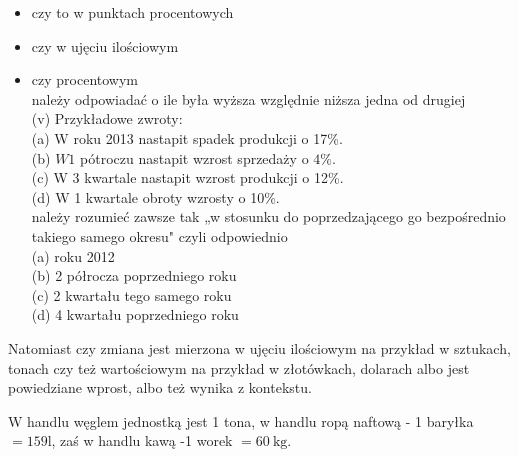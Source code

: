 \documentclass[10pt]{article}
\begin{document}
\begin{itemize}
  \item czy to w punktach procentowych
  \item czy w ujęciu ilościowym
  \item czy procentowym\\
należy odpowiadać o ile była wyższa względnie niższa jedna od drugiej\\
(v) Przykładowe zwroty:\\
(a) W roku 2013 nastapit spadek produkcji o 17\%.\\
(b) \(W 1\) pótroczu nastapit wzrost sprzedaży o \(4 \%\).\\
(c) W 3 kwartale nastapit wzrost produkcji o 12\%.\\
(d) W 1 kwartale obroty wzrosty o 10\%.\\
należy rozumieć zawsze tak „w stosunku do poprzedzającego go bezpośrednio takiego samego okresu" czyli odpowiednio\\
(a) roku 2012\\
(b) 2 półrocza poprzedniego roku\\
(c) 2 kwartału tego samego roku\\
(d) 4 kwartału poprzedniego roku
\end{itemize}

Natomiast czy zmiana jest mierzona w ujęciu ilościowym na przykład w sztukach, tonach czy też wartościowym na przykład w złotówkach, dolarach albo jest powiedziane wprost, albo też wynika z kontekstu.

W handlu węglem jednostką jest 1 tona, w handlu ropą naftową - 1 baryłka \(=159 \mathrm{l}\), zaś w handlu kawą -1 worek \(=60 \mathrm{~kg}\).
\end{document}
